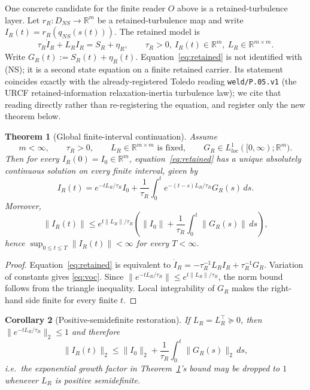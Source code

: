 \documentclass[11pt]{article}
\theoremstyle{plain}
\newtheorem{theorem}{Theorem}
\newtheorem{corollary}[theorem]{Corollary}
\theoremstyle{definition}
\begin{document}
One concrete candidate for the finite reader $O$ above is a retained-turbulence layer. Let
$r_R: D_{NS}\to\mathbb{R}^m$ be a retained-turbulence map and write $I_R(t) = r_R(q_{NS}(s(t)))$.
The retained model is
\begin{equation}
  \tau_R \dot I_R + L_R I_R = S_R + \eta_R, \qquad \tau_R>0,\ I_R(t)\in\mathbb{R}^m,\ L_R\in\mathbb{R}^{m\times m}. \label{eq:retained}
\end{equation}
Write $G_R(t) := S_R(t)+\eta_R(t)$. Equation~\eqref{eq:retained} is not identified with (NS); it is
a second state equation on a finite retained carrier. Its statement coincides exactly with the
already-registered Toledo reading \texttt{weld/P.05.v1} (the URCF retained-information
relaxation-inertia turbulence law); we cite that reading directly rather than re-registering the
equation, and register only the new theorem below.

\begin{theorem}[Global finite-interval continuation]\label{thm:continuation}
Assume
\begin{equation}
  m<\infty, \qquad \tau_R>0, \qquad L_R\in\mathbb{R}^{m\times m} \text{ is fixed}, \qquad G_R\in L^1_{loc}([0,\infty);\mathbb{R}^m). \label{eq:hyp}
\end{equation}
Then for every $I_R(0)=I_0\in\mathbb{R}^m$, equation~\eqref{eq:retained} has a unique absolutely
continuous solution on every finite interval, given by
\begin{equation}
  I_R(t) = e^{-tL_R/\tau_R} I_0 + \frac{1}{\tau_R}\int_0^t e^{-(t-s)L_R/\tau_R} G_R(s)\,ds. \label{eq:voc}
\end{equation}
Moreover,
\begin{equation}
  \|I_R(t)\| \le e^{t\|L_R\|/\tau_R}\left(\|I_0\| + \frac{1}{\tau_R}\int_0^t \|G_R(s)\|\,ds\right),
\end{equation}
hence $\sup_{0\le t\le T}\|I_R(t)\| < \infty$ for every $T<\infty$.
\end{theorem}

\begin{proof}
Equation~\eqref{eq:retained} is equivalent to $\dot I_R = -\tau_R^{-1}L_R I_R + \tau_R^{-1}G_R$.
Variation of constants gives \eqref{eq:voc}. Since $\|e^{-tL_R/\tau_R}\| \le e^{t\|L_R\|/\tau_R}$,
the norm bound follows from the triangle inequality. Local integrability of $G_R$ makes the
right-hand side finite for every finite $t$.
\end{proof}

\begin{corollary}[Positive-semidefinite restoration]\label{cor:psd}
If $L_R = L_R^\top \succeq 0$, then $\|e^{-tL_R/\tau_R}\|_2 \le 1$ and therefore
\begin{equation}
  \|I_R(t)\|_2 \le \|I_0\|_2 + \frac{1}{\tau_R}\int_0^t \|G_R(s)\|_2\,ds,
\end{equation}
i.e.\ the exponential growth factor in Theorem~\ref{thm:continuation}'s bound may be dropped to $1$
whenever $L_R$ is positive semidefinite.
\end{corollary}
\end{document}
